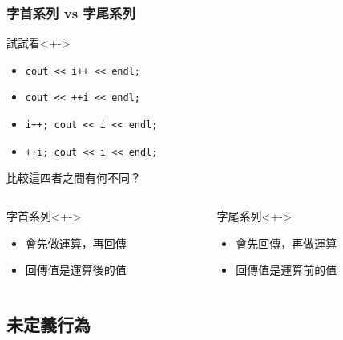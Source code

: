 \documentclass[utf8]{beamer}
\begin{document}
\begin{CJK}{UTF8}{bkai}
\begin{frame}[fragile]
  \frametitle{字首系列 vs 字尾系列}
  \begin{block}{試試看}<+->
    \begin{itemize}
    \item \lstinline{cout << i++ << endl;}{}
    \item \lstinline{cout << ++i << endl;}{}
    \item \lstinline{i++; cout << i << endl;}{}
    \item \lstinline{++i; cout << i << endl;}{}
    \end{itemize}
    比較這四者之間有何不同？
  \end{block}
  \begin{columns}[T]
    \begin{column}[T]{5.5cm}
    \begin{exampleblock}{字首系列}<+->
      \begin{itemize}
      \item 會先做運算，再回傳
      \item<+-> 回傳值是運算\alert{後}的值
      \end{itemize}
    \end{exampleblock}
    \end{column}
    \begin{column}[T]{5.5cm}
    \begin{alertblock}{字尾系列}<+->
      \begin{itemize}
      \item 會先回傳，再做運算
      \item<+-> 回傳值是運算\alert{前}的值
      \end{itemize}
    \end{alertblock}
    \end{column}
  \end{columns}
\end{frame}

\subsection{未定義行為}


\end{CJK}
\end{document}
